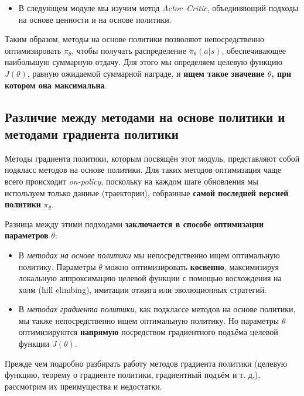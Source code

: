 \documentclass[11pt,a4paper]{article}
\begin{document}
\begin{itemize}
\tightlist
\item
  В следующем модуле мы изучим метод \emph{Actor--Critic}, объединяющий подходы на основе ценности и на основе политики.
\end{itemize}

Таким образом, методы на основе политики позволяют непосредственно оптимизировать \(\pi_\theta\), чтобы получать распределение \(\pi_\theta(a|s)\), обеспечивающее наибольшую суммарную отдачу. Для этого мы определяем целевую функцию \(J(\theta)\), равную ожидаемой суммарной награде, и \textbf{ищем такое значение \(\theta\), при котором она максимальна}.

\subsection{Различие между методами на основе политики и методами градиента политики}\label{the-difference-between-policy-based-and-policy-gradient-methods}

Методы градиента политики, которым посвящён этот модуль, представляют собой подкласс методов на основе политики. Для таких методов оптимизация чаще всего происходит \emph{on-policy}, поскольку на каждом шаге обновления мы используем только данные (траектории), собранные \textbf{самой последней версией политики} \(\pi_\theta\).

Разница между этими подходами \textbf{заключается в способе оптимизации параметров} \(\theta\):

\begin{itemize}
\tightlist
\item
  В \emph{методах на основе политики} мы непосредственно ищем оптимальную политику. Параметры \(\theta\) можно оптимизировать \textbf{косвенно}, максимизируя локальную аппроксимацию целевой функции с помощью восхождения на холм (hill climbing), имитации отжига или эволюционных стратегий.
\item
  В \emph{методах градиента политики}, как подклассе методов на основе политики, мы также непосредственно ищем оптимальную политику. Но параметры \(\theta\) оптимизируются \textbf{напрямую} посредством градиентного подъёма целевой функции \(J(\theta)\).
\end{itemize}

Прежде чем подробно разбирать работу методов градиента политики (целевую функцию, теорему о градиенте политики, градиентный подъём и т. д.), рассмотрим их преимущества и недостатки.
\end{document}
